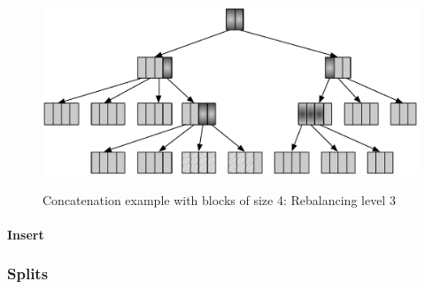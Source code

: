\begin{figure}[h!]
  \centering
  \includegraphics[width=\textwidth]{Figures/Concat3.pdf}
  \label{Concat3Benchmarks}
  \caption{Concatenation example with blocks of size 4: Rebalancing level 3}
\end{figure}


\paragraph{Insert}




\subsubsection{Splits}


